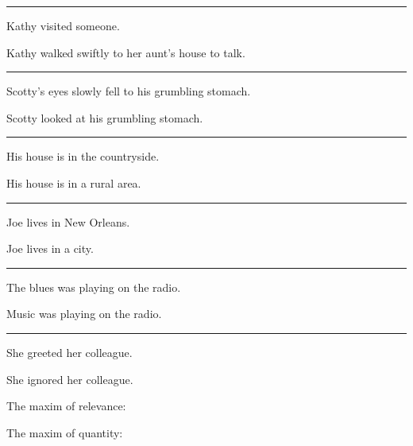 \documentclass[addpoints]{exam}
\begin{document}
\begin{questions}
        \question[1] \rule{4cm}{0.4pt} \parbox[t]{\linewidth}{
                                         Kathy visited someone.

                                         Kathy walked swiftly to her aunt's house to talk.
                                       }
          \newpage
        \question[1] \rule{4cm}{0.4pt} \parbox[t]{\linewidth}{
                                         Scotty's eyes slowly fell to his grumbling stomach.

                                         Scotty looked at his grumbling stomach.
                                       }
        \question[1] \rule{4cm}{0.4pt} \parbox[t]{\linewidth}{
                                         His house is in the countryside.

                                         His house is in a rural area.
                                       }
        \question[1] \rule{4cm}{0.4pt} \parbox[t]{\linewidth}{
                                         Joe lives in New Orleans.

                                         Joe lives in a city.
                                       }
        \question[1] \rule{4cm}{0.4pt} \parbox[t]{\linewidth}{
                                         The blues was playing on the radio.

                                         Music was playing on the radio.
                                       }
        \question[1] \rule{4cm}{0.4pt} \parbox[t]{\linewidth}{
                                         She greeted her colleague.

                                         She ignored her colleague.
                                       }

        \question[2] The maxim of relevance: \hrulefill

          \hrulefill

          \hrulefill

          \hrulefill
        \question[2] The maxim of quantity: \hrulefill


\end{questions}
\end{document}
